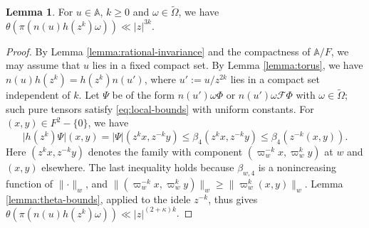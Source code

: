 \documentclass[reqno]{amsart}
\theoremstyle{plain}
\theoremstyle{definition}
\theoremstyle{itplain}
\newtheorem{lemma}[theorem]{Lemma}
\numberwithin{equation}{section}
\numberwithin{theorem}{section}
\begin{document}
\begin{lemma}\label{lemma:growth}
  For $u \in \mathbb{A}$, $k \geq 0$ and $\omega \in \tilde{\Omega}$, we have $\theta(\pi(n(u) h(z^k) \omega)) \ll \lvert z \rvert^{3 k}$.
\end{lemma}
\begin{proof}
  By Lemma \ref{lemma:rational-invariance} and the compactness of $\mathbb{A} / F$, we may assume that $u$ lies in a fixed compact set.  By Lemma \ref{lemma:torus}, we have $n(u) h(z^k) = h(z^k) n(u')$, where $u' := u / z^{2 k}$ lies in a compact set independent of $k$.  Let $\Psi$ be of the form $n(u') \omega \Phi$ or $n(u') \omega \mathcal{F} \Phi$ with $\omega \in \tilde{\Omega}$; such pure tensors satisfy \eqref{eq:local-bounds} with uniform constants.  For $(x, y) \in F^2 - \{0\}$, we have
  \begin{equation}\label{eq:cusp-term}
    \lvert h(z^k) \Psi \rvert(x, y) = \lvert \Psi \rvert(z^k x, z^{-k} y) \leq \beta_4(z^k x, z^{-k} y) \leq \beta_4(z^{-k} (x, y)).
  \end{equation}
  Here $(z^k x, z^{-k} y)$ denotes the family with component $(\varpi_w^{-k} x, \varpi_w^k y)$ at $w$ and $(x, y)$ elsewhere.  The last inequality holds because $\beta_{w, 4}$ is a nonincreasing function of $\lVert \cdot \rVert_w$, and $\lVert (\varpi_w^{-k} x, \varpi_w^{k} y) \rVert_w \geq \lVert \varpi_w^{k} (x, y) \rVert_w$.  Lemma \ref{lemma:theta-bounds}, applied to the idele $z^{-k}$, thus gives $\theta(\pi(n(u) h(z^k) \omega)) \ll \lvert z \rvert^{(2 + \kappa) k}$.
\end{proof}
\end{document}
